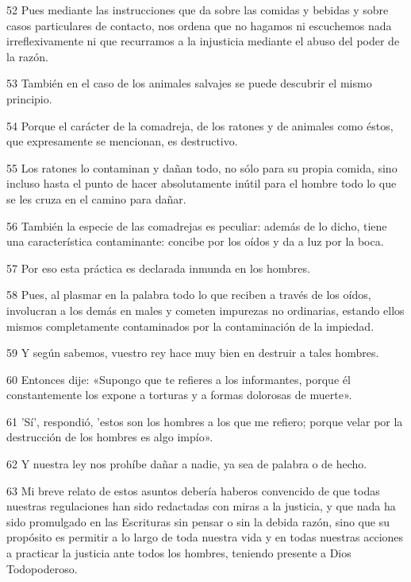 \par 52 Pues mediante las instrucciones que da sobre las comidas y bebidas y sobre casos particulares de contacto, nos ordena que no hagamos ni escuchemos nada irreflexivamente ni que recurramos a la injusticia mediante el abuso del poder de la razón.

\par 53 También en el caso de los animales salvajes se puede descubrir el mismo principio.

\par 54 Porque el carácter de la comadreja, de los ratones y de animales como éstos, que expresamente se mencionan, es destructivo.

\par 55 Los ratones lo contaminan y dañan todo, no sólo para su propia comida, sino incluso hasta el punto de hacer absolutamente inútil para el hombre todo lo que se les cruza en el camino para dañar.

\par 56 También la especie de las comadrejas es peculiar: además de lo dicho, tiene una característica contaminante: concibe por los oídos y da a luz por la boca.

\par 57 Por eso esta práctica es declarada inmunda en los hombres.

\par 58 Pues, al plasmar en la palabra todo lo que reciben a través de los oídos, involucran a los demás en males y cometen impurezas no ordinarias, estando ellos mismos completamente contaminados por la contaminación de la impiedad.

\par 59 Y según sabemos, vuestro rey hace muy bien en destruir a tales hombres.

\par 60 Entonces dije: «Supongo que te refieres a los informantes, porque él constantemente los expone a torturas y a formas dolorosas de muerte».

\par 61 'Sí', respondió, 'estos son los hombres a los que me refiero; porque velar por la destrucción de los hombres es algo impío».

\par 62 Y nuestra ley nos prohíbe dañar a nadie, ya sea de palabra o de hecho.

\par 63 Mi breve relato de estos asuntos debería haberos convencido de que todas nuestras regulaciones han sido redactadas con miras a la justicia, y que nada ha sido promulgado en las Escrituras sin pensar o sin la debida razón, sino que su propósito es permitir a lo largo de toda nuestra vida y en todas nuestras acciones a practicar la justicia ante todos los hombres, teniendo presente a Dios Todopoderoso.

